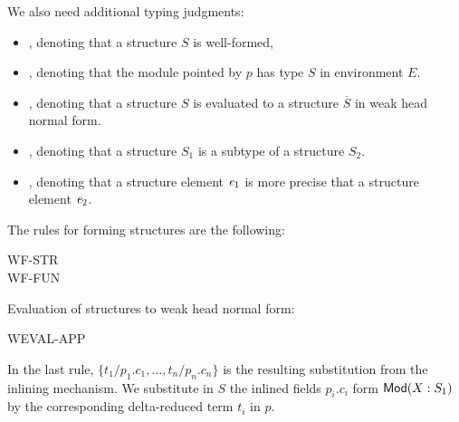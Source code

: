 We also need additional typing judgments: 
\begin{itemize}
\item {}, denoting that a structure $S$ is well-formed, 

\item {}, denoting that the module pointed by $p$ has type $S$ in
environment $E$.

\item {}, denoting that a structure $S$ is evaluated to 
a structure $\overline{S}$ in weak head normal form.

\item {}, denoting that a structure $S_1$ is a subtype of a
structure $S_2$.

\item {}, denoting that a structure element
  ${\it e}_1$ is more precise that a structure element ${\it e}_2$.
\end{itemize}
The rules for forming structures are the following:
\begin{description}
\item[WF-STR]
\item[WF-FUN]
\end{description}
Evaluation of structures to weak head normal form:
\begin{description}
\item[WEVAL-APP]
\end{description}
In the last rule, $\{t_1/p_1.c_1,\ldots,t_n/p_n.c_n\}$ is the resulting
 substitution from the inlining mechanism. We substitute in $S$ the
 inlined fields $p_i.c_i$ form ${\sf Mod}({X}:{S_1})$ by the corresponding delta-reduced term $t_i$ in $p$.
